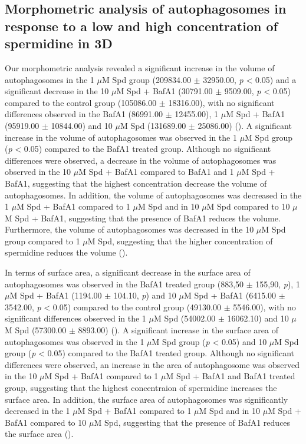 \subsection{Morphometric analysis of autophagosomes  in response to a low and high concentration of spermidine in 3D}
Our morphometric analysis revealed a significant increase in the volume of autophagosomes in the 1 $\mu$M Spd group (209834.00 $\pm$ 32950.00, \textit{p} < 0.05) and a significant decrease in the 10 $\mu$M Spd + BafA1 (30791.00 $\pm$ 9509.00, \textit{p} < 0.05) compared to the control group (105086.00 $\pm$ 18316.00), with no significant differences observed in the BafA1 (86991.00 $\pm$ 12455.00), 1 $\mu$M Spd + BafA1 (95919.00 $\pm$ 10844.00) and 10 $\mu$M Spd (131689.00 $\pm$ 25086.00) (). A significant increase in the volume of autophagosomes was observed in the 1 $\mu$M Spd group (\textit{p} < 0.05) compared to the BafA1 treated group. Although no significant differences were observed, a decrease in the volume of autophagosomes was observed in the 10 $\mu$M Spd + BafA1 compared to BafA1 and 1 $\mu$M Spd + BafA1, suggesting that the highest concentration decrease the volume of autophagosomes. In addition, the volume of autophagosomes was decreased in the 1 $\mu$M Spd + BafA1 compared to 1 $\mu$M Spd and in 10 $\mu$M Spd  compared to 10 $\mu$M Spd + BafA1, suggesting that the presence of BafA1 reduces the volume. Furthermore, the volume of autophagosomes was decreased in the 10 $\mu$M Spd group compared to 1 $\mu$M Spd, suggesting that the higher concentration of spermidine reduces the volume (). 

In terms of surface area, a significant decrease in the surface area of autophagosomes was observed in the BafA1 treated group (883,50 $\pm$ 155,90, \textit{p}), 1 $\mu$M Spd + BafA1 (1194.00 $\pm$ 104.10, \textit{p}) and 10 $\mu$M Spd + BafA1 (6415.00 $\pm$ 3542.00, \textit{p} < 0.05) compared to the control group (49130.00 $\pm$ 5546.00), with no significant differences observed in the 1 $\mu$M Spd (54002.00 $\pm$ 16062.10) and 10 $\mu$M Spd (57300.00 $\pm$ 8893.00) (). A significant increase in the surface area of autophagosomes was observed in the 1 $\mu$M Spd group (\textit{p} < 0.05) and 10 $\mu$M Spd group (\textit{p} < 0.05) compared to the BafA1 treated group. Although no significant differences were observed, an increase in the area of autophagosome was observed in the 10 $\mu$M Spd + BafA1 compared to 1 $\mu$M Spd + BafA1 and BafA1 treated group, suggesting that the highest concentraion of spermidine increases the surface area. In addition, the surface area of autophagosomes was significantly decreased in the 1 $\mu$M Spd + BafA1 compared to 1 $\mu$M Spd and in 10 $\mu$M Spd + BafA1 compared to 10 $\mu$M Spd, suggesting that the presence of BafA1 reduces the surface area (). 

